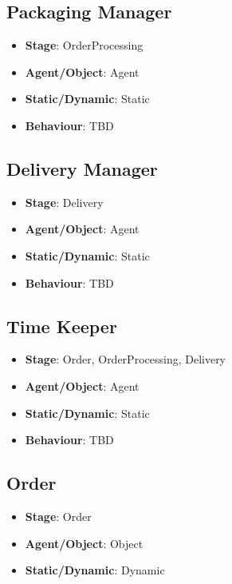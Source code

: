 \documentclass[12pt]{article}
\begin{document}
\subsection{Packaging Manager}%
\label{sub:packaging_manager}
\begin{itemize}
    \item \textbf{Stage}: OrderProcessing
    \item \textbf{Agent/Object}: Agent
    \item \textbf{Static/Dynamic}: Static
    \item \textbf{Behaviour}: TBD
\end{itemize}

\subsection{Delivery Manager}%
\label{sub:delivery_manager}
\begin{itemize}
    \item \textbf{Stage}: Delivery
    \item \textbf{Agent/Object}: Agent
    \item \textbf{Static/Dynamic}: Static
    \item \textbf{Behaviour}: TBD
\end{itemize}

\subsection{Time Keeper}%
\label{sub:time_keeper}
\begin{itemize}
    \item \textbf{Stage}: Order, OrderProcessing, Delivery
    \item \textbf{Agent/Object}: Agent
    \item \textbf{Static/Dynamic}: Static
    \item \textbf{Behaviour}: TBD
\end{itemize}

\subsection{Order}%
\label{sub:order}
\begin{itemize}
    \item \textbf{Stage}: Order
    \item \textbf{Agent/Object}: Object
    \item \textbf{Static/Dynamic}: Dynamic
\end{itemize}
\end{document}
